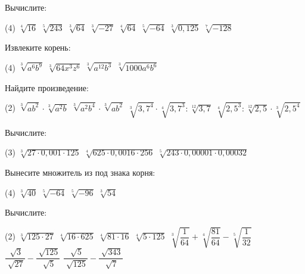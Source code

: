 %
%

\begin{class}[number=1]
	\begin{listofex}
		\item Вычислите:
		\begin{tasks}(4)
			\task \( \sqrt[4]{16} \)
			\task \( \sqrt[5]{243} \)
			\task \( \sqrt[3]{64} \)
			\task \( \sqrt[3]{-27} \)
			\task \( \sqrt[4]{64} \)
			\task \( \sqrt[5]{-64} \)
			\task \( \sqrt[3]{0,125} \)
			\task \( \sqrt[7]{-128} \)
		\end{tasks}
		\item Извлеките корень:
		\begin{tasks}(4)
			\task \( \sqrt[3]{a^6b^9} \)
			\task \( \sqrt[3]{64x^3z^6} \)
			\task \( \sqrt[3]{a^{12}b^3} \)
			\task \( \sqrt[3]{1000a^6b^6} \)
		\end{tasks}
		\item Найдите произведение:
		\begin{tasks}(2)
			\task \( \sqrt[3]{ab^2} \cdot \sqrt[3]{a^2b} \)
			\task \( \sqrt[3]{a^2b^4} \cdot \sqrt[3]{ab^2} \)
			\task \( \sqrt[3]{3,7^4} \cdot \sqrt[4]{3,7^3} : \sqrt[12]{3,7} \)
			\task \( \sqrt[4]{2,5^3} : \sqrt[12]{2,5} \cdot \sqrt[3]{2,5^4} \)
		\end{tasks}
		\item Вычислите:
		\begin{tasks}(3)
			\task \( \sqrt[3]{27 \cdot 0,001 \cdot 125} \)
			\task \( \sqrt[4]{625 \cdot 0,0016 \cdot 256} \)
			\task \( \sqrt[5]{243 \cdot 0,00001 \cdot 0,00032} \)
		\end{tasks}
		\item Вынесите множитель из под знака корня:
		\begin{tasks}(4)
			\task \( \sqrt[3]{40} \)
			\task \( \sqrt[5]{-64} \)
			\task \( \sqrt[5]{-96} \)
			\task \( \sqrt[3]{54} \)
		\end{tasks}
		\item Вычислите:
		\begin{tasks}(2)
			\task \( \sqrt[3]{125 \cdot 27} \)
			\task \( \sqrt[4]{16 \cdot 625} \)
			\task \( \sqrt[4]{81 \cdot 16} \)
			\task \( \sqrt[4]{5 \cdot 125} \)
			\task \( \sqrt[3]{\dfrac{1}{64}} +\sqrt[4]{\dfrac{81}{64}} - \sqrt[5]{\dfrac{1}{32}} \)
			\task \( \dfrac{\sqrt[]{3}}{\sqrt[]{27}} - \dfrac{\sqrt[]{125}}{\sqrt[]{5}} \)
			\task \( \dfrac{\sqrt[]{5}}{\sqrt[]{125}} - \dfrac{\sqrt[]{343}}{\sqrt[]{7}} \)

\end{tasks}
\end{listofex}
\end{class}
